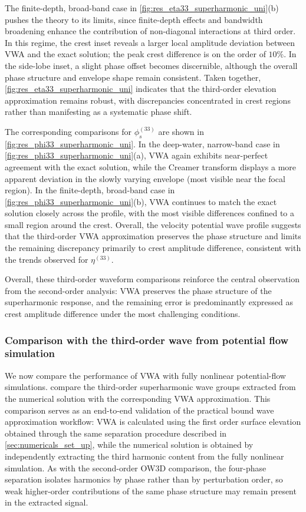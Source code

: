 \documentclass[lineno]{JFM-FLM_Au}
\begin{document}
The finite-depth, broad-band case in \cref{fig:res_eta33_superharmonic_uni}(b) pushes the theory to its limits, since finite-depth effects and bandwidth broadening enhance the contribution of non-diagonal interactions at third order. In this regime, the crest inset reveals a larger local amplitude deviation between VWA and the exact solution; the peak crest difference is on the order of $10\%$. In the side-lobe inset, a slight phase offset becomes discernible, although the overall phase structure and envelope shape remain consistent. Taken together, \cref{fig:res_eta33_superharmonic_uni} indicates that the third-order elevation approximation remains robust, with discrepancies concentrated in crest regions rather than manifesting as a systematic phase shift.

The corresponding comparisons for $\phi_s^{(33)}$ are shown in \cref{fig:res_phi33_superharmonic_uni}. In the deep-water, narrow-band case in \cref{fig:res_phi33_superharmonic_uni}(a), VWA again exhibits near-perfect agreement with the exact solution, while the Creamer transform displays a more apparent deviation in the slowly varying envelope (most visible near the focal region). In the finite-depth, broad-band case in \cref{fig:res_phi33_superharmonic_uni}(b), VWA continues to match the exact solution closely across the profile, with the most visible differences confined to a small region around the crest. Overall, the velocity potential wave profile suggests that the third-order VWA approximation preserves the phase structure and limits the remaining discrepancy primarily to crest amplitude difference, consistent with the trends observed for $\eta^{(33)}$.

Overall, these third-order waveform comparisons reinforce the central observation from the second-order analysis: VWA preserves the phase structure of the superharmonic response, and the remaining error is predominantly expressed as crest amplitude difference under the most challenging conditions.




\subsubsection{Comparison with the third-order wave from potential flow simulation}\label{3rdFNPF}


We now compare the performance of VWA with fully nonlinear potential-flow simulations.  compare the third-order superharmonic wave groups extracted from the numerical solution with the corresponding VWA approximation. This comparison serves as an end-to-end validation of the practical bound wave approximation workflow: VWA is calculated using the first order surface elevation obtained through the same separation procedure described in \cref{sec:numericals_set_up}, while the numerical solution is obtained by independently extracting the third harmonic content from the fully nonlinear simulation. As with the second-order OW3D comparison, the four-phase separation isolates harmonics by phase rather than by perturbation order, so weak higher-order contributions of the same phase structure may remain present in the extracted signal.
\end{document}
